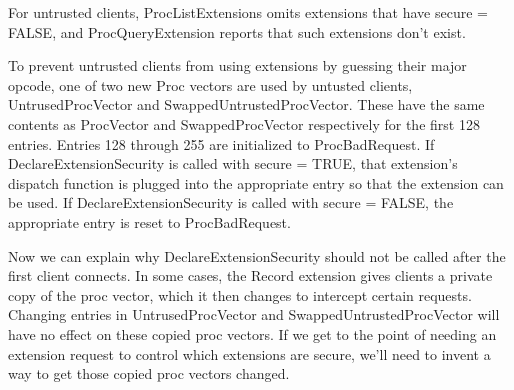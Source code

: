 \documentclass{article}
\begin{document}
For untrusted clients, ProcListExtensions omits extensions that have
secure = FALSE, and ProcQueryExtension reports that such extensions
don't exist.

To prevent untrusted clients from using extensions by guessing their
major opcode, one of two new Proc vectors are used by untusted
clients, UntrusedProcVector and SwappedUntrustedProcVector.  These
have the same contents as ProcVector and SwappedProcVector
respectively for the first 128 entries.  Entries 128 through 255 are
initialized to ProcBadRequest.  If DeclareExtensionSecurity is called
with secure = TRUE, that extension's dispatch function is plugged
into the appropriate entry so that the extension can be used.  If
DeclareExtensionSecurity is called with secure = FALSE, the
appropriate entry is reset to ProcBadRequest.

Now we can explain why DeclareExtensionSecurity should not be called
after the first client connects.  In some cases, the Record extension
gives clients a private copy of the proc vector, which it then changes
to intercept certain requests.  Changing entries in UntrusedProcVector
and SwappedUntrustedProcVector will have no effect on these copied
proc vectors.  If we get to the point of needing an extension request
to control which extensions are secure, we'll need to invent a way to
get those copied proc vectors changed.
\end{document}

